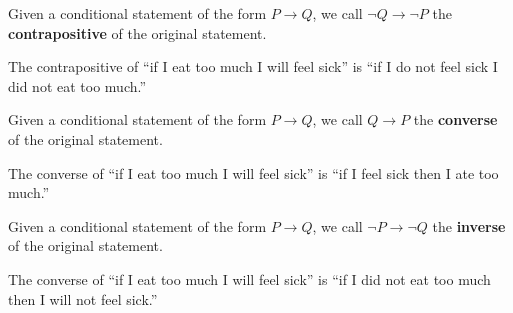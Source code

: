 \documentclass[a4paper,english,12pt]{article}
\begin{document}
\begin{defn}[Contrapositive] Given a conditional statement of the form $P \rightarrow Q$, we call $\neg Q \rightarrow \neg P$ the \textbf{contrapositive} of the original statement. 
\end{defn}
\begin{exmp} The contrapositive of ``if I eat too much I will feel sick'' is ``if I do not feel sick I did not eat too much.''
\end{exmp}
\begin{defn}[Converse] Given a conditional statement of the form $P \rightarrow Q$, we call $Q \rightarrow P$ the \textbf{converse} of the original statement. 
\begin{exmp} The converse of ``if I eat too much I will feel sick'' is ``if I feel sick then I ate too much.''
\end{exmp}
\end{defn}
\begin{defn}[Inverse] Given a conditional statement of the form $P \rightarrow Q$, we call $\neg P\rightarrow \neg Q$ the \textbf{inverse} of the original statement.
\end{defn}	
\begin{exmp} The converse of ``if I eat too much I will feel sick'' is ``if I did not eat too much then I will not feel sick.''
\end{exmp}
\end{document}
